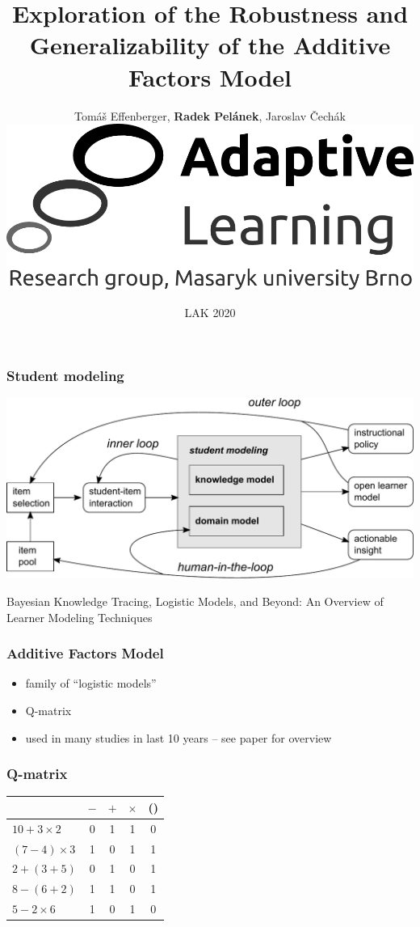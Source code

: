 \documentclass[bigger]{beamer}
\title{Exploration of the Robustness and Generalizability of the Additive Factors Model}
\author{Tom{\'a}{\v{s}} Effenberger, \textbf{Radek Pel\'anek}, Jaroslav \v{C}ech\'ak\\[10mm]
\includegraphics[width=.3\linewidth]{al-logo}
}
\date{LAK 2020}
\begin{document}
\frame{\titlepage}

\begin{frame}
  \frametitle{Student modeling}

  \begin{center}
    \includegraphics[width=\linewidth]{learner-modeling-context.pdf}
  \end{center}

  \bigskip
  \begin{flushright}
    {\tiny Bayesian Knowledge Tracing, Logistic Models, and Beyond: An Overview of Learner Modeling Techniques}
  \end{flushright}
\end{frame}

\begin{frame}
  \frametitle{Additive Factors Model}

  \begin{itemize}
  \item family of ``logistic models''
  \item Q-matrix
  \item used in many studies in last 10 years -- see paper for overview
  \end{itemize}
\end{frame}

\begin{frame}
  \frametitle{Q-matrix}

  \begin{center}
      \begin{tabular}{lcccc}
    \toprule
    & $-$ & $+$ & $\times$ & () \\
    \midrule
    $10+3\times 2$ & 0 & 1 &  1 & 0 \\
    $(7-4)\times 3$ & 1 & 0 & 1 & 1 \\
    $2+ (3 + 5)$ & 0 & 1 & 0 & 1 \\
    $8-(6+2)$ & 1 & 1 & 0 & 1 \\
    $5-2\times 6$ & 1 & 0 &  1 & 0 \\
    \bottomrule
  \end{tabular}
  \end{center}
\end{frame}
\end{document}
